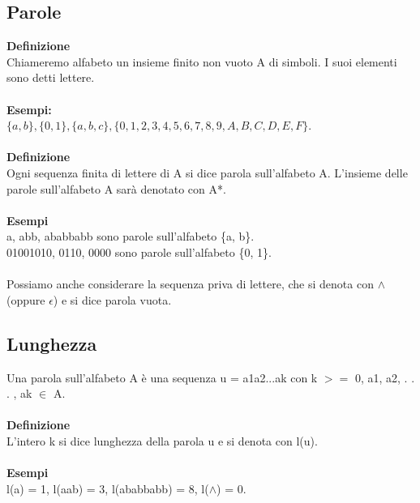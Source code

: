 \subsection{Parole}
\textbf{Definizione}\\
Chiameremo alfabeto un insieme finito non vuoto A di simboli. I suoi elementi sono detti lettere.\\\\
\textbf{Esempi:}\\
$\{a, b\} , \{0, 1\} , \{a, b, c\} , \{0, 1, 2, 3, 4, 5, 6, 7, 8, 9, A, B, C, D, E,F\}$.\\\\
\textbf{Definizione}\\
Ogni sequenza finita di lettere di A si dice parola sull’alfabeto A. L’insieme delle parole sull’alfabeto A sarà denotato con A*.\\\\
\textbf{Esempi}\\
a, abb, ababbabb sono parole sull’alfabeto \{a, b\}.\\
01001010, 0110, 0000 sono parole sull’alfabeto \{0, 1\}.\\\\
Possiamo anche considerare la sequenza priva di lettere, che si denota con $\wedge$ (oppure $\epsilon$) e si dice parola vuota.

\newpage
\subsection{Lunghezza}
Una parola sull’alfabeto A è una sequenza u = a1a2...ak con k $>=$ 0, a1, a2, . . . , ak $\in$ A.\\\\
\textbf{Definizione}\\
\vspace{0.3cm}
L’intero k si dice lunghezza della parola u e si denota con l(u).\\\\
\textbf{Esempi}\\
l(a) = 1, l(aab) = 3, l(ababbabb) = 8, l($\wedge$) = 0.
